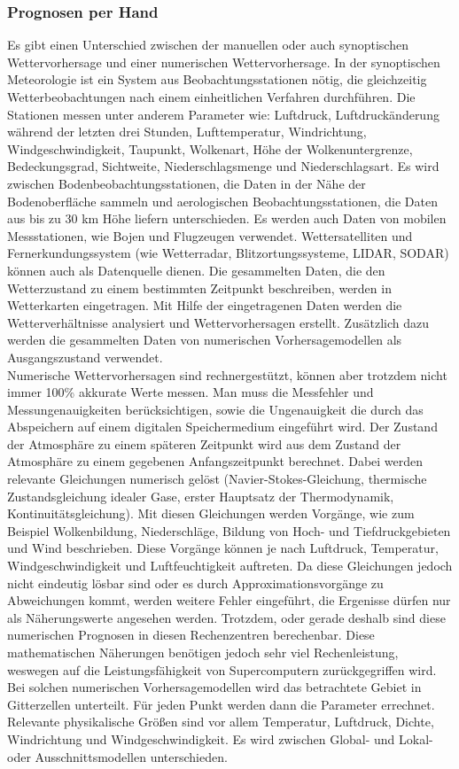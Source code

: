 \subsubsection{Prognosen per Hand} %
Es gibt einen Unterschied zwischen der manuellen oder auch
synoptischen Wettervorhersage und einer numerischen Wettervorhersage.
In der synoptischen Meteorologie ist ein System aus Beobachtungsstationen
nötig, die gleichzeitig Wetterbeobachtungen nach einem einheitlichen Verfahren durchführen.
Die Stationen messen unter anderem Parameter wie:
Luftdruck, Luftdruckänderung während der letzten drei Stunden,
Lufttemperatur, Windrichtung, Windgeschwindigkeit, Taupunkt,
Wolkenart, Höhe der Wolkenuntergrenze, Bedeckungsgrad,
Sichtweite, Niederschlagsmenge und Niederschlagsart.
Es wird zwischen Bodenbeobachtungsstationen, die Daten in der Nähe
der Bodenoberfläche sammeln und aerologischen Beobachtungsstationen,
die Daten aus bis zu 30 km Höhe liefern unterschieden.
Es werden auch Daten von mobilen Messstationen, wie Bojen und Flugzeugen verwendet.
Wettersatelliten und Fernerkundungssystem
(wie Wetterradar, Blitzortungssysteme, LIDAR, SODAR) können auch als Datenquelle dienen.
Die gesammelten Daten, die den Wetterzustand zu einem bestimmten
Zeitpunkt beschreiben, werden in Wetterkarten eingetragen.
Mit Hilfe der eingetragenen Daten werden die Wetterverhältnisse
analysiert und Wettervorhersagen erstellt.
Zusätzlich dazu werden die gesammelten Daten von numerischen
Vorhersagemodellen als Ausgangszustand verwendet. \cite{noaa}
\\
Numerische Wettervorhersagen sind rechnergestützt, können aber trotzdem nicht
immer 100\% akkurate Werte messen.
Man muss die Messfehler und Messungenauigkeiten berücksichtigen, sowie die
Ungenauigkeit die durch das Abspeichern auf einem digitalen Speichermedium
eingeführt wird. \cite{floatungenau}
Der Zustand der Atmosphäre zu einem späteren Zeitpunkt wird aus dem Zustand
der Atmosphäre zu einem gegebenen Anfangszeitpunkt berechnet.
Dabei werden relevante Gleichungen numerisch gelöst
(Navier-Stokes-Gleichung, thermische Zustandsgleichung idealer Gase,
erster Hauptsatz der Thermodynamik, Kontinuitätsgleichung).
Mit diesen Gleichungen werden Vorgänge, wie zum Beispiel Wolkenbildung,
Niederschläge, Bildung von Hoch- und Tiefdruckgebieten und Wind beschrieben.
Diese Vorgänge können je nach Luftdruck, Temperatur, Windgeschwindigkeit
und Luftfeuchtigkeit auftreten.
Da diese Gleichungen jedoch nicht eindeutig lösbar sind oder es
durch Approximationsvorgänge zu Abweichungen kommt, werden weitere Fehler eingeführt,
die Ergenisse dürfen nur als Näherungswerte angesehen werden.
Trotzdem, oder gerade deshalb sind diese numerischen Prognosen in diesen Rechenzentren berechenbar.
Diese mathematischen Näherungen benötigen jedoch sehr viel Rechenleistung,
weswegen auf die Leistungsfähigkeit von Supercomputern zurückgegriffen wird.
Bei solchen numerischen Vorhersagemodellen wird das betrachtete Gebiet in Gitterzellen unterteilt.
Für jeden Punkt werden dann die Parameter errechnet.
Relevante physikalische Größen sind vor allem Temperatur,
Luftdruck, Dichte, Windrichtung und Windgeschwindigkeit.
Es wird zwischen Global- und Lokal- oder Ausschnittsmodellen unterschieden.


